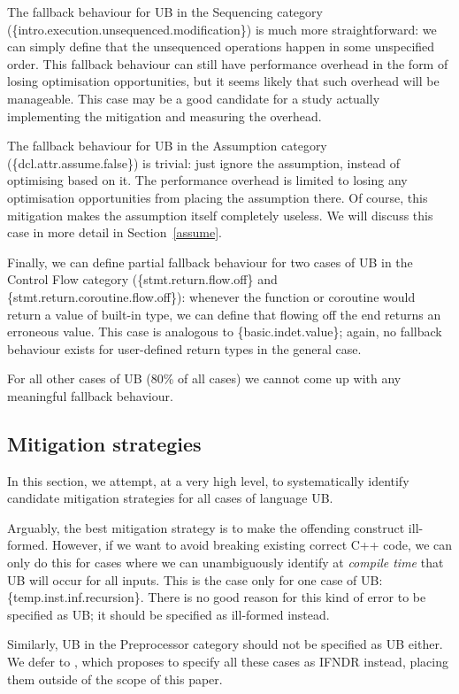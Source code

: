 The fallback behaviour for UB in the Sequencing category (\{intro.execution.unsequenced.modification\}) is much more straightforward: we can simply define that the unsequenced operations happen in some unspecified order. This fallback behaviour can still have performance overhead in the form of losing  optimisation opportunities, but it seems likely that such overhead will be manageable. This case may be a good candidate for a study actually implementing the mitigation and measuring the overhead.

The fallback behaviour for UB in the Assumption category (\{dcl.attr.assume.false\}) is trivial: just ignore the assumption, instead of optimising based on it. The performance overhead is limited to losing any optimisation opportunities from placing the assumption there. Of course, this mitigation makes the assumption itself completely useless. We will discuss this case in more detail in Section~\ref{assume}.

Finally, we can define partial fallback behaviour for two cases of UB in the Control Flow category  (\{stmt.return.flow.off\} and \{stmt.return.coroutine.flow.off\}): whenever the function or coroutine would return a value of built-in type, we can define that flowing off the end returns an erroneous value. This case is analogous to \{basic.indet.value\}; again, no fallback behaviour exists for user-defined return types in the general case.

For all other cases of UB (80\% of all cases) we cannot come up with any meaningful fallback behaviour.

\subsection{Mitigation strategies}
\label{mitigation}

In this section, we attempt, at a very high level, to systematically identify candidate mitigation strategies for all cases of language UB.

Arguably, the best mitigation strategy is to make the offending construct ill-formed. However, if we want to avoid breaking existing correct C++ code, we can only do this for cases where we can unambiguously identify at \emph{compile time} that UB will occur for all inputs. This is the case only for one case of UB: 
\{temp.inst.inf.recursion\}. There is no good reason for this kind of error to be specified as UB; it should be specified as ill-formed instead.

Similarly, UB in the Preprocessor category should not be specified as UB either. We defer to \cite{P2843R2}, which proposes to specify all these cases as IFNDR instead, placing them outside of the scope of this paper.

